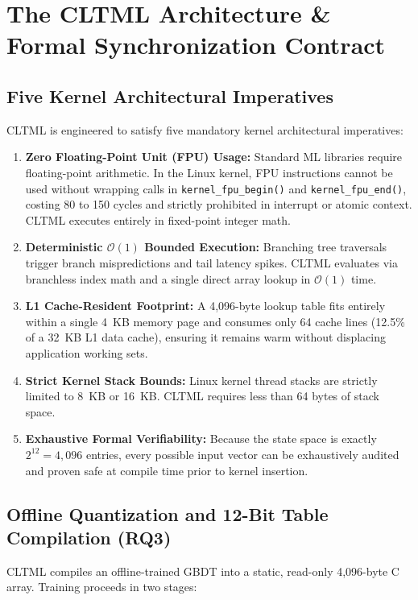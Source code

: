 \documentclass[conference]{IEEEtran}
\begin{document}
\section{The CLTML Architecture \& Formal Synchronization Contract}

\subsection{Five Kernel Architectural Imperatives}
CLTML is engineered to satisfy five mandatory kernel architectural imperatives:
\begin{enumerate}
    \item \textbf{Zero Floating-Point Unit (FPU) Usage:} Standard ML libraries require floating-point arithmetic. In the Linux kernel, FPU instructions cannot be used without wrapping calls in \texttt{kernel\_fpu\_begin()} and \texttt{kernel\_fpu\_end()}, costing 80 to 150 cycles and strictly prohibited in interrupt or atomic context. CLTML executes entirely in fixed-point integer math.
    \item \textbf{Deterministic $\mathcal{O}(1)$ Bounded Execution:} Branching tree traversals trigger branch mispredictions and tail latency spikes. CLTML evaluates via branchless index math and a single direct array lookup in $\mathcal{O}(1)$ time.
    \item \textbf{L1 Cache-Resident Footprint:} A 4,096-byte lookup table fits entirely within a single 4~KB memory page and consumes only 64 cache lines (12.5\% of a 32~KB L1 data cache), ensuring it remains warm without displacing application working sets.
    \item \textbf{Strict Kernel Stack Bounds:} Linux kernel thread stacks are strictly limited to 8~KB or 16~KB. CLTML requires less than 64 bytes of stack space.
    \item \textbf{Exhaustive Formal Verifiability:} Because the state space is exactly $2^{12} = 4,096$ entries, every possible input vector can be exhaustively audited and proven safe at compile time prior to kernel insertion.
\end{enumerate}

\subsection{Offline Quantization and 12-Bit Table Compilation (RQ3)}
CLTML compiles an offline-trained GBDT into a static, read-only 4,096-byte C array. Training proceeds in two stages:
\end{document}
